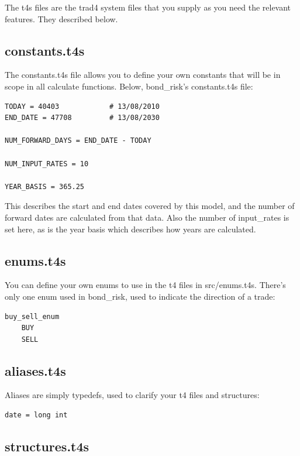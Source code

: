 \documentclass{report}
\begin{document}
The t4s files are the trad4 system files that you supply as you need the relevant features. They described below.

\subsection{constants.t4s}

The constants.t4s file allows you to define your own constants that will be in scope in all calculate functions. Below, bond_risk's constants.t4s file:


\begin{verbatim}
TODAY = 40403            # 13/08/2010
END_DATE = 47708         # 13/08/2030

NUM_FORWARD_DAYS = END_DATE - TODAY

NUM_INPUT_RATES = 10

YEAR_BASIS = 365.25
\end{verbatim}

This describes the start and end dates covered by this model, and the number of forward dates are calculated from that data. Also the number of input_rates is set here, as is the year basis which describes how years are calculated.

\subsection{enums.t4s}

You can define your own enums to use in the t4 files in src/enums.t4s. There's only one enum used in bond_risk, used to indicate the direction of a trade:

\begin{verbatim}
buy_sell_enum
    BUY
    SELL
\end{verbatim}


\subsection{aliases.t4s}

Aliases are simply typedefs, used to clarify your t4 files and structures:

\begin{verbatim}
date = long int
\end{verbatim}

\subsection{structures.t4s}
\end{document}
